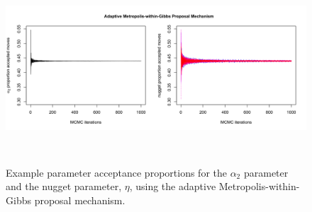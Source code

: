 \documentclass[12pt]{article}
\begin{document}
\begin{figure}
	\centering
		{\includegraphics[width=6in,height=2.5in]{figs/sims/example_acceptance_rates.png}}
	\caption{Example parameter acceptance proportions for the $\alpha_2$ parameter and the nugget parameter, $\eta$, using the adaptive Metropolis-within-Gibbs proposal mechanism.}\label{sfig:example_acceptance_rates}
\end{figure}

\clearpage
\end{document}
